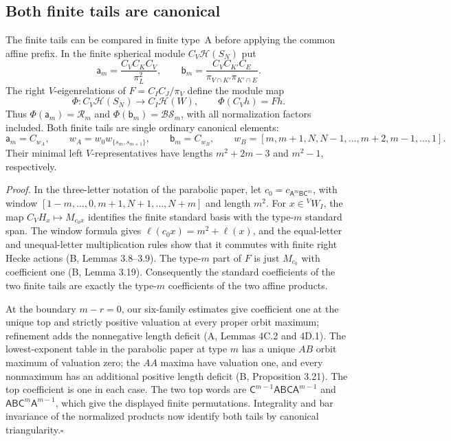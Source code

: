 \clearpage
\subsection{Both finite tails are canonical}
\label{sec:finite-tails}

The finite tails can be compared in finite type~A before applying the
common affine prefix. In the finite spherical module $C_V\mathcal H(S_N)$ put
\[
 \mathsf a_m=\frac{C_VC_KC_V}{\pi_L^2},\qquad
 \mathsf b_m=\frac{C_VC_{K'}C_E}
 {\pi_{V\cap K'}\pi_{K'\cap E}}.
\]
The right $V$-eigenrelations of $F=C_IC_J/\pi_V$ define the module map
\[
 \Phi:C_V\mathcal H(S_N)\longrightarrow C_I\mathcal H(W),
 \qquad \Phi(C_Vh)=Fh.
\]
Thus $\Phi(\mathsf a_m)=\mathcal R_m$ and
$\Phi(\mathsf b_m)=\mathcal{BS}_m$, with all normalization factors included.
Both finite tails are single ordinary canonical elements:
\[
 \mathsf a_m=C_{w_A},\qquad
 w_A=w_0w_{\{s_m,s_{m+1}\}},
 \qquad
 \mathsf b_m=C_{w_B},\qquad
 w_B=[m,m+1,N,N-1,\ldots,m+2,m-1,\ldots,1].
\]
Their minimal left $V$-representatives have lengths $m^2+2m-3$
and $m^2-1$, respectively.

\noindent\textit{Proof.}
In the three-letter notation of the parabolic paper, let
$c_0=c_{\mathsf A^m\mathsf B\mathsf C^m}$, with window
$[1-m,\ldots,0,m+1,N+1,\ldots,N+m]$ and length $m^2$.
For $x\in{}^VW_I$, the map
$C_VH_x\mapsto M_{c_0x}$ identifies the finite standard basis with
the type-$m$ standard span. The window formula gives
$\ell(c_0x)=m^2+\ell(x)$, and the equal-letter and unequal-letter
multiplication rules show that it commutes with finite right Hecke
actions (B, Lemmas 3.8--3.9).
The type-$m$ part of $F$ is just $M_{c_0}$ with coefficient one
(B, Lemma 3.19).
Consequently the standard coefficients of the two finite tails are
exactly the type-$m$ coefficients of the two affine products.

At the boundary $m-r=0$, our six-family estimates give coefficient
one at the unique top and strictly positive valuation at every
proper orbit maximum; refinement adds the nonnegative length
deficit (A, Lemmas 4C.2 and 4D.1).
The lowest-exponent table in the parabolic paper at type $m$ has a unique $AB$ orbit
maximum of valuation zero; the $AA$ maxima have valuation one,
and every nonmaximum has an additional positive length deficit
(B, Proposition 3.21). The top coefficient is one in each case.
The two top words are $\mathsf C^{m-1}\mathsf A\mathsf B\mathsf C
\mathsf A^{m-1}$ and $\mathsf A\mathsf B\mathsf C^m\mathsf A^{m-1}$,
which give the displayed finite permutations. Integrality and bar
invariance of the normalized products now identify both tails by
canonical triangularity.\hfill$\square$

